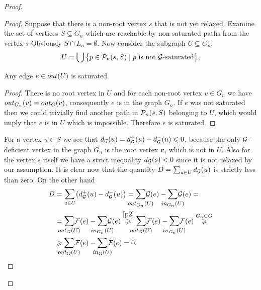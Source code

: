 \documentclass[12pt]{amsart}
\begin{document}
\begin{proof}
\begin{proof}
        Suppose that there is a non-root vertex $s$ that is not yet relaxed.
        Examine the set of vertices $S \subseteq G_n$ which are reachable by non-saturated paths from the vertex $s$
        Obviously $S \cap L_n = \emptyset$.
        Now consider the subgraph $U \subseteq G_n$:
        \[
          U = \bigcup\big\{p \in \gnpaths(s, S) \mid \text{$p$ is not $\cal{G}$-saturated}\big\},
        \]
        \begin{lemma}
          Any edge $e \in \eout(U)$ is saturated.
        \end{lemma}
        \begin{proof}
          There is no root vertex in $U$ and for each non-root vertex $v \in G_n$ we have
          $\eout_{G_n}(v) = \eout_G(v)$, consequently $e$ is in the graph $G_n$.
          If $e$ was not saturated then we could trivially find another path in $\gnpaths(s, S)$ belonging to $U$, which would imply that
            $e$ is in $U$ which is impossible.
          Therefore $e$ is saturated.
        \end{proof}
        For a vertex $u \in S$ we see that $d_{\cal{G}}(u) = d^{+}_{\cal{G}}(u) - d^{-}_{\cal{G}}(u) \leq 0$, because
          the only $\cal{G}$-deficient vertex in the graph $G_n$ is the root vertex $\root$, which is not in $U$.
        Also for the vertex $s$ itself we have a strict inequality $d_{\cal{G}}(s) < 0$ since it is not relaxed by our assumption.
        It is clear now that the quantity $D = \sum_{u \in U} d_{\cal{G}}(u)$ is strictly less than zero.
        On the other hand
        \[
        \begin{split}
          D &= \mathlarger\sum_{u \in U} \big(d^{+}_{\cal{G}}(u) - d^{-}_{\cal{G}}(u)\big)
          = \mathlarger{\smashoperator{\sum_{\eout_{G_n}(U)}}} \cal{G}(e) - \mathlarger{\smashoperator{\sum_{\ein_{G_n}(U)}}} \cal{G}(e) = \\
          &= \mathlarger{\smashoperator{\sum_{\eout_{G}(U)}}} \flowpos(e) - \mathlarger{\smashoperator{\sum_{\ein_{G_n}(U)}}} \cal{G}(e)
            \overset{\ref{p2}}{\geq} \mathlarger{\smashoperator{\sum_{\eout_G(U)}}} \flowpos(e) - \mathlarger{\smashoperator{\sum_{\ein_{G_n}(U)}}} \flowpos(e) 
            \overset{G_n \subset G} \geq \\
          &\geq \mathlarger{\smashoperator{\sum_{\eout_G(U)}}} \flowpos(e) - \mathlarger{\smashoperator{\sum_{\ein_{G}(U)}}} \flowpos(e) = 0.

\end{split}\]
\end{proof}
\end{proof}
\end{document}
